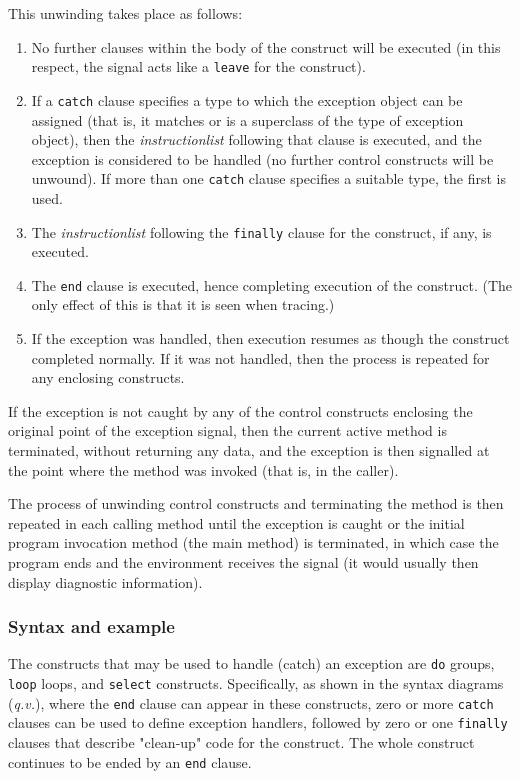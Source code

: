 This unwinding takes place as follows:
\begin{enumerate}
\item No further clauses within the body of the construct will be executed
(in this respect, the signal acts like a \texttt{leave} for the
construct).
\item If a \texttt{catch} clause specifies a type to which
the exception object can be assigned (that is, it matches or is a
superclass of the type of exception object), then the
\emph{instructionlist} following that clause is executed, and the
exception is considered to be handled (no further control constructs
will be unwound).
If more than one \texttt{catch} clause specifies a suitable type, the
first is used.
\item The \emph{instructionlist} following the \texttt{finally} clause
for the construct, if any, is executed.
\item The \texttt{end} clause is executed, hence completing execution of
the construct.
(The only effect of this is that it is seen when tracing.)
\item 
If the exception was handled, then execution resumes as though the
construct completed normally.  If it was not handled, then the process
is repeated for any enclosing constructs.
\end{enumerate}
 
If the exception is not caught by any of the control constructs
enclosing the original point of the exception signal, then
the current active method is terminated, without returning any data, and
the exception is then signalled at the point where the method was
invoked (that is, in the caller).
 
The process of unwinding control constructs and terminating the method
is then repeated in each calling method until the exception is caught or
the initial program invocation method (the main method) is terminated,
in which case the program ends and the environment receives the signal
(it would usually then display diagnostic information).
\subsubsection{Syntax and example}
 
The constructs that may be used to handle (catch) an exception are
\texttt{do} groups, \texttt{loop} loops, and \texttt{select} constructs.
Specifically, as shown in the syntax diagrams (\emph{q.v.}), where the
\texttt{end} clause can appear in these constructs, zero or more
\texttt{catch} clauses can be used to define exception handlers,
followed by zero or one \texttt{finally} clauses that describe
"clean-up" code for the construct.
The whole construct continues to be ended by an \texttt{end} clause.
 
